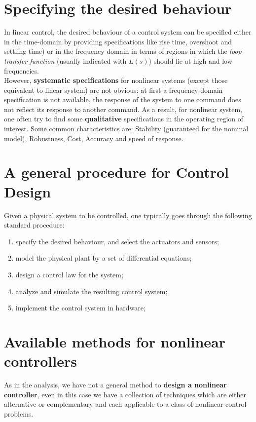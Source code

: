 \section{Specifying the desired behaviour}
In linear control, the desired behaviour of a control system can be specified either in the time-domain by providing specifications like rise time, overshoot and settling time) or  in the frequency domain in terms of regions in which the \textit{loop transfer function} (usually indicated with $L(s)$) should lie at high and low frequencies.\\
However, \textbf{systematic specifications} for nonlinear systems (except those equivalent to linear system) are not obvious: at first a frequency-domain specification is not available, the response of the system to one command does not reflect its response to another command. As a result, for nonlinear system, one often try to find some \textbf{qualitative} specifications in the operating region of interest. Some common characteristics are: Stability (guaranteed for the nominal model), Robustness, Cost, Accuracy and speed of response.

\section{A general procedure for Control Design}
Given a physical system to be controlled, one typically goes through the following standard procedure:
\begin{enumerate}
    \item specify the desired behaviour, and select the actuators and sensors; 
    \item model the physical plant by a set of differential equations; 
    \item design a control law for the system;
    \item analyze and simulate the resulting control system;
    \item implement the control system in hardware;
\end{enumerate}

\section{Available methods for nonlinear controllers}
As in the analysis, we have not a general method to \textbf{design a nonlinear controller}, even in this case we have a collection of techniques which are either alternative or complementary and each applicable to a class of nonlinear control problems.\\
